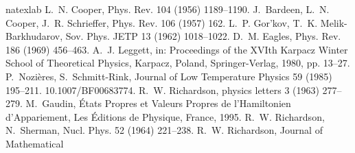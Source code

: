 \documentclass[5p,twocolumn]{elsarticle}
\begin{document}

%
\begin{thebibliography}{16}
\expandafter\ifx\csname natexlab\endcsname\relax\def\natexlab#1{#1}\fi
\providecommand{\bibinfo}[2]{#2}
\ifx\xfnm\relax \def\xfnm[#1]{\unskip,\space#1}\fi
\bibinfo{author}{L.~N. Cooper}, \bibinfo{journal}{Phys. Rev.}
  \bibinfo{volume}{104} (\bibinfo{year}{1956}) \bibinfo{pages}{1189--1190}.
\bibinfo{author}{J.~Bardeen}, \bibinfo{author}{L.~N. Cooper},
  \bibinfo{author}{J.~R. Schrieffer}, \bibinfo{journal}{Phys. Rev.}
  \bibinfo{volume}{106} (\bibinfo{year}{1957}) \bibinfo{pages}{162}.
\bibinfo{author}{L.~P. {Gor'kov}}, \bibinfo{author}{T.~K. Melik-Barkhudarov},
  \bibinfo{journal}{Sov. Phys. JETP} \bibinfo{volume}{13}
  (\bibinfo{year}{1962}) \bibinfo{pages}{1018--1022}.
\bibinfo{author}{D.~M. Eagles}, \bibinfo{journal}{Phys. Rev.}
  \bibinfo{volume}{186} (\bibinfo{year}{1969}) \bibinfo{pages}{456--463}.
\bibinfo{author}{A.~J. Leggett}, in: \bibinfo{booktitle}{Proceedings of the
  XVIth Karpacz Winter School of Theoretical Physics, Karpacz, Poland},
  \bibinfo{publisher}{Springer-Verlag}, \bibinfo{year}{1980}, pp.
  \bibinfo{pages}{13--27}.
\bibinfo{author}{P.~Nozi\`{e}res}, \bibinfo{author}{S.~Schmitt-Rink},
  \bibinfo{journal}{Journal of Low Temperature Physics} \bibinfo{volume}{59}
  (\bibinfo{year}{1985}) \bibinfo{pages}{195--211}.
  \bibinfo{note}{10.1007/BF00683774}.
\bibinfo{author}{R.~W. Richardson}, \bibinfo{journal}{physics letters}
  \bibinfo{volume}{3} (\bibinfo{year}{1963}) \bibinfo{pages}{277--279}.
\bibinfo{author}{M.~Gaudin}, \bibinfo{title}{{\'{E}tats Propres et Valeurs
  Propres de l'Hamiltonien d'Appariement}}, \bibinfo{publisher}{Les
  \'{E}ditions de Physique, France}, \bibinfo{year}{1995}.
\bibinfo{author}{R.~W. Richardson}, \bibinfo{author}{N.~Sherman},
  \bibinfo{journal}{Nucl. Phys.} \bibinfo{volume}{52} (\bibinfo{year}{1964})
  \bibinfo{pages}{221--238}.
\bibinfo{author}{R.~W. Richardson}, \bibinfo{journal}{Journal of Mathematical
}
\end{thebibliography}
\end{document}
